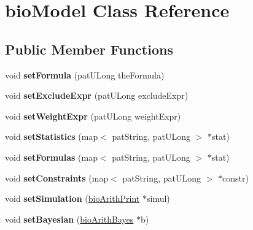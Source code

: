 \hypertarget{classbio_model}{}\section{bio\+Model Class Reference}
\label{classbio_model}
\subsection*{Public Member Functions}
\begin{DoxyCompactItemize}
\item 
\mbox{\label{classbio_model_a408209fbea4b5a21f13ac62e276459f3}} 
void {\bfseries set\+Formula} (pat\+U\+Long the\+Formula)
\item 
\mbox{\label{classbio_model_a03a13cdc8b4397f1a5ef6207185e78be}} 
void {\bfseries set\+Exclude\+Expr} (pat\+U\+Long exclude\+Expr)
\item 
\mbox{\label{classbio_model_a8650e153e8b532a9f2789fdd9d1d620d}} 
void {\bfseries set\+Weight\+Expr} (pat\+U\+Long weight\+Expr)
\item 
\mbox{\label{classbio_model_a5caa754ec994e89b675dcafe46a54cc4}} 
void {\bfseries set\+Statistics} (map$<$ pat\+String, pat\+U\+Long $>$ $\ast$stat)
\item 
\mbox{\label{classbio_model_ae7dbc296cc9314067c05131ddf394359}} 
void {\bfseries set\+Formulas} (map$<$ pat\+String, pat\+U\+Long $>$ $\ast$stat)
\item 
\mbox{\label{classbio_model_ac4fa8d014aec7b01f77fc7de87f36493}} 
void {\bfseries set\+Constraints} (map$<$ pat\+String, pat\+U\+Long $>$ $\ast$constr)
\item 
\mbox{\label{classbio_model_a8b60411da179a0871dd7b6d5a2c6c52f}} 
void {\bfseries set\+Simulation} (\hyperlink{classbio_arith_print}{bio\+Arith\+Print} $\ast$simul)
\item 
\mbox{\label{classbio_model_a6fe18f34fda1590fc5eed3a7e9a12b84}} 
void {\bfseries set\+Bayesian} (\hyperlink{classbio_arith_bayes}{bio\+Arith\+Bayes} $\ast$b)
\item 

\end{DoxyCompactItemize}
